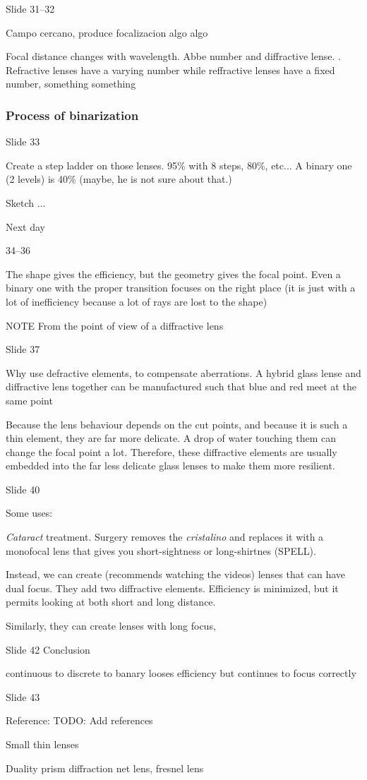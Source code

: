 \documentclass[../main/main.tex]{subfiles}
\begin{document}
Slide 31--32

Campo cercano, produce focalizacion algo algo

Focal distance changes with wavelength. Abbe number and diffractive lense. . Refractive lenses have a varying number while reffractive lenses have a fixed number, something something


\subsubsection*{Process of binarization}

Slide 33

Create a step ladder on those lenses.  95\% with 8 steps, 80\%, etc... A binary one (2 levels) is 40\% (maybe, he is not sure about that.)


Sketch ...

Next day

34--36

The shape gives the efficiency, but the geometry gives the focal point. Even a binary one with the proper transition focuses on the right place (it is just with a lot of inefficiency because a lot of rays are lost to the shape)

NOTE From the point of view of a diffractive lens


Slide 37

Why use defractive elements, to compensate aberrations. A hybrid glass lense and diffractive lens together can be manufactured such that blue and red meet at the same point

Because the lens behaviour depends on the cut points, and because it is such a thin element, they are far more delicate. A drop of water touching them can change the focal point a lot. Therefore, these diffractive elements are usually embedded into the far less delicate glass lenses to make them more resilient.

Slide 40

Some uses:

\emph{Cataract} treatment. Surgery removes the \emph{cristalino} and replaces it with a monofocal lens that gives you short-sightness or long-shirtnes (SPELL).

Instead, we can create (recommends watching the videos) lenses that can have dual focus. They add two diffractive elements. Efficiency is minimized, but it permits looking at both short and long distance.

Similarly, they can create lenses with long focus,



Slide 42 Conclusion



continuous to discrete to banary looses efficiency but continues to focus correctly


Slide 43

Reference: TODO: Add references

Small thin lenses

Duality prism diffraction net
lens, fresnel lens
\end{document}
